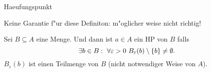 \documentclass[class=article, crop=false]{standalone}
\begin{document}
\begin{zettel}{Haeufungspunkt}
\begin{flashcard}[]{}
	\begin{definition}[Haeufungspunkt]
		Keine Garantie f"ur diese Definiton: m"oglicher weise nicht richtig!

		Sei $B \subseteq A$ eine Menge. Und  dann ist $a \in  A$ ein HP von $B$ falls
		\[
			\exists b \in  B : \forall \varepsilon > 0 \ B_{\varepsilon}(b) \setminus \set{b} \neq \emptyset
		.\]
		$B_{\varepsilon}(b)$ ist einen Teilmenge von $B$ (nicht notwendiger Weise von $A$).
	\end{definition}

\end{flashcard}
\end{zettel}
\end{document}
